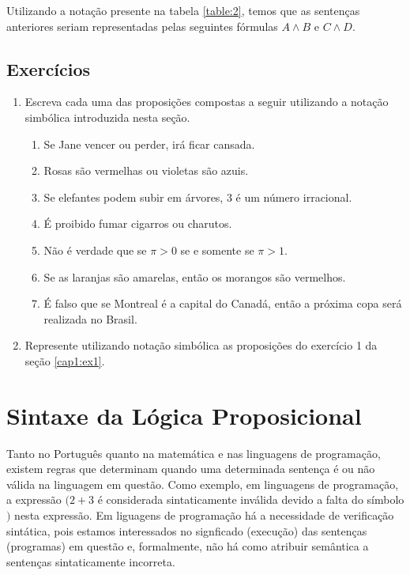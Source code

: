 Utilizando a nota\c{c}\~ao presente na tabela \ref{table:2}, temos que as senten\c{c}as anteriores seriam representadas pelas seguintes f\'ormulas
$A \land B$  e $C \land D$.

\subsection{Exerc\'icios}

\begin{enumerate}
  \item Escreva cada uma das proposi\c{c}\~oes compostas a seguir utilizando a nota\c{c}\~ao simb\'olica introduzida nesta se\c{c}\~ao.
  \begin{enumerate}
    \item Se Jane vencer ou perder, ir\'a ficar cansada.
    \item Rosas s\~ao vermelhas ou violetas s\~ao azuis.
    \item Se elefantes podem subir em \'arvores, 3 \'e um n\'umero irracional.
    \item \'E proibido fumar cigarros ou charutos.
    \item N\~ao \'e verdade que se $\pi > 0$ se e somente se $\pi > 1$.
    \item Se as laranjas s\~ao amarelas, ent\~ao os morangos s\~ao vermelhos.
    \item \'E falso que se Montreal \'e a capital do Canad\'a, ent\~ao a pr\'oxima copa ser\'a realizada no Brasil.
  \end{enumerate}
  \item Represente utilizando nota\c{c}\~ao simb\'olica as proposi\c{c}\~oes do exerc\'icio 1 da se\c{c}\~ao \ref{cap1:ex1}.
\end{enumerate}

\section{Sintaxe da L\'ogica Proposicional}

Tanto no Portugu\^es quanto na matem\'atica e nas linguagens de programa\c{c}\~ao, existem regras que determinam quando uma determinada 
senten\c{c}a \'e ou n\~ao v\'alida na linguagem em quest\~ao. Como exemplo, em linguagens de programa\c{c}\~ao, a express\~ao $(2 + 3$ \'e
considerada sintaticamente inv\'alida devido a falta do s\'imbolo $)$ nesta express\~ao. Em liguagens de programa\c{c}\~ao h\'a a necessidade
de verifica\c{c}\~ao sint\'atica, pois estamos interessados no signficado (execu\c{c}\~ao) das senten\c{c}as (programas) em quest\~ao e, 
formalmente, n\~ao h\'a como atribuir sem\^antica a senten\c{c}as sintaticamente incorreta.

